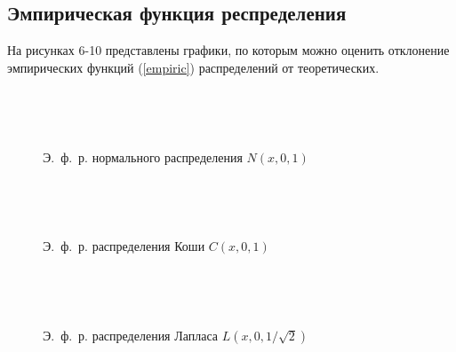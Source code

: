 \documentclass[12pt]{article}
\begin{document}
\subsection{Эмпирическая функция респределения}
На рисунках 6-10 представлены графики, по которым можно оценить отклонение эмпирических функций (\ref{empiric}) распределений от теоретических.
\begin{figure}[h!]
	\begin{center}
	\begin{minipage}[h]{0.60\linewidth}
	\end{minipage}
	\phantom{0}\\
	\begin{minipage}[h]{0.60\linewidth}
	\end{minipage}
	\phantom{0}\\
	\begin{minipage}[h]{0.60\linewidth}
	\end{minipage}
	\caption{Э.~ф.~р. нормального распределения $N(x, 0, 1)$}
\end{center}
\end{figure}
\newpage
\begin{figure}[h!]
	\begin{center}
	\begin{minipage}[h]{0.65\linewidth}
	\end{minipage}
	\phantom{0}\\
	\begin{minipage}[h]{0.65\linewidth}
	\end{minipage}
	\phantom{0}\\
	\begin{minipage}[h]{0.65\linewidth}
	\end{minipage}
	\caption{Э.~ф.~р. распределения Коши $C(x, 0, 1)$}
\end{center}
\end{figure}
\newpage\begin{figure}[h!]
	\begin{center}
	\begin{minipage}[h]{0.65\linewidth}
	\end{minipage}
	\phantom{0}\\
	\begin{minipage}[h]{0.65\linewidth}
	\end{minipage}
	\phantom{0}\\
	\begin{minipage}[h]{0.65\linewidth}
	\end{minipage}
	\caption{Э.~ф.~р. распределения Лапласа $L(x, 0, 1/\sqrt{2})$}
\end{center}
\end{figure}
\end{document}
